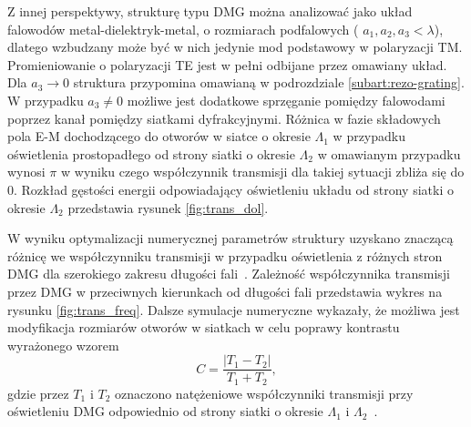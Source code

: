  Z innej perspektywy, strukturę typu DMG można analizować jako układ falowodów metal-dielektryk-metal, o rozmiarach podfalowych ( $a_1,a_2,a_3 < \lambda$), dlatego wzbudzany może być w nich jedynie mod podstawowy w polaryzacji TM. Promieniowanie o polaryzacji TE jest w pełni odbijane przez omawiany układ. Dla $a_3 \to 0$ struktura przypomina omawianą w podrozdziale \ref{subart:rezo-grating}. W przypadku $a_3 \ne 0$ możliwe jest dodatkowe sprzęganie pomiędzy falowodami poprzez kanał pomiędzy siatkami dyfrakcyjnymi. Różnica w fazie składowych pola E-M dochodzącego do otworów w siatce o okresie $\Lambda_1$ w przypadku oświetlenia prostopadłego od strony siatki o okresie $\Lambda_2$ w omawianym przypadku wynosi $\pi$ w wyniku czego współczynnik transmisji dla takiej sytuacji zbliża się do 0. Rozkład gęstości energii odpowiadający oświetleniu układu od strony siatki o okresie $\Lambda_2$ przedstawia rysunek \ref{fig:trans_dol}.

W wyniku optymalizacji numerycznej parametrów struktury uzyskano znaczącą różnicę we współczynniku transmisji w przypadku oświetlenia z różnych stron DMG dla szerokiego zakresu długości fali~\cite{Stolarek:13}. Zależność współczynnika transmisji przez DMG w przeciwnych kierunkach od długości fali przedstawia wykres na rysunku \ref{fig:trans_freq}. Dalsze symulacje numeryczne wykazały, że możliwa jest modyfikacja rozmiarów otworów w siatkach w celu poprawy kontrastu wyrażonego wzorem
\begin{equation}
C=\frac{|T_1 - T_2|}{T_1+T_2},
\label{eq:contrast}
\end{equation}
gdzie przez $T_1$ i $T_2$ oznaczono natężeniowe współczynniki transmisji przy oświetleniu DMG odpowiednio od strony siatki o okresie $\Lambda_1$ i $\Lambda_2$~\cite{stolarek2013broadband}.

